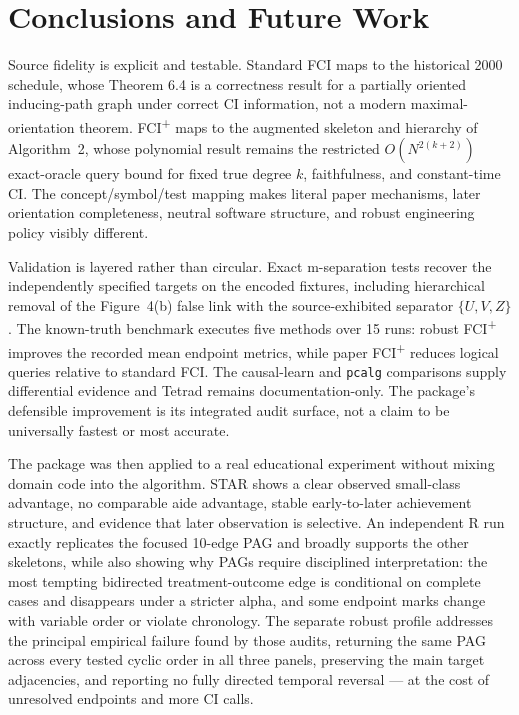 \documentclass[11pt,a4paper]{article}
\newcommand{\FCIplus}{FCI\textsuperscript{+}}
\newcommand{\code}[1]{\texttt{#1}}
\begin{document}
\section{Conclusions and Future Work}
\label{sec:conclusions}

Source fidelity is explicit and testable. Standard FCI maps to the historical
2000 schedule, whose Theorem 6.4 is a correctness result for a partially
oriented inducing-path graph under correct CI information, not a modern
maximal-orientation theorem. \FCIplus{} maps to the augmented skeleton and
hierarchy of Algorithm~2, whose polynomial result remains the restricted
\(O(N^{2(k+2)})\) exact-oracle query bound for fixed true degree \(k\),
faithfulness, and constant-time CI. The concept/symbol/test mapping makes
literal paper mechanisms, later orientation completeness, neutral software
structure, and robust engineering policy visibly different.

Validation is layered rather than circular. Exact m-separation tests recover the
independently specified targets on the encoded fixtures, including hierarchical
removal of the Figure~4(b) false link with the source-exhibited separator
\(\{U,V,Z\}\). The known-truth benchmark executes five methods over 15 runs:
robust \FCIplus{} improves the recorded mean endpoint metrics, while paper
\FCIplus{} reduces logical queries relative to standard FCI. The causal-learn
and \code{pcalg} comparisons supply differential evidence and Tetrad remains
documentation-only. The package's defensible improvement is its integrated audit
surface, not a claim to be universally fastest or most accurate.

The package was then applied to a real educational experiment without mixing
domain code into the algorithm. STAR shows a clear observed small-class
advantage, no comparable aide advantage, stable early-to-later achievement
structure, and evidence that later observation is selective. An independent R
run exactly replicates the focused 10-edge PAG and broadly supports the other
skeletons, while also showing why PAGs require disciplined interpretation: the
most tempting bidirected treatment-outcome edge is conditional on complete cases
and disappears under a stricter alpha, and some endpoint marks change with
variable order or violate chronology. The separate robust profile addresses the
principal empirical failure found by those audits, returning the same PAG across
every tested cyclic order in all three panels, preserving the main target
adjacencies, and reporting no fully directed temporal reversal --- at the cost
of unresolved endpoints and more CI calls.
\end{document}
